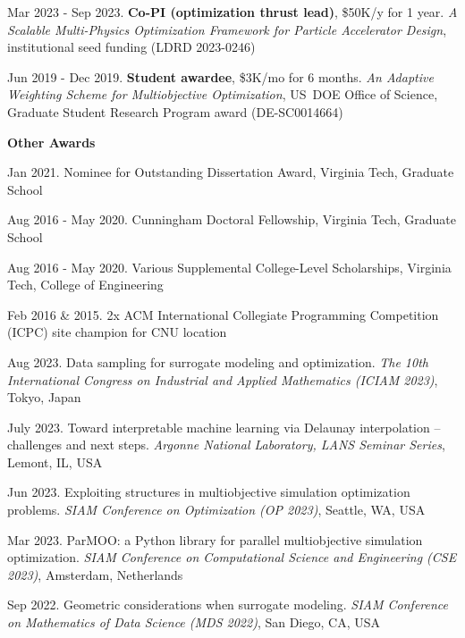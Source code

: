 \documentclass[alternative,compact,blue]{/Users/tyler/Git/thchang-style/styles/lualatex/yaac-another-awesome-cv}
\begin{document}
\begin{etaremune}
\item Mar 2023 - Sep 2023. {\bf Co-PI (optimization thrust lead)}, \$50K/y for 1 year. {\sl A Scalable Multi-Physics Optimization Framework for Particle Accelerator Design}, institutional seed funding (LDRD 2023-0246)
\item Jun 2019 - Dec 2019. {\bf Student awardee}, \$3K/mo for 6 months. {\sl An Adaptive Weighting Scheme for Multiobjective Optimization}, US~DOE Office of Science, Graduate Student Research Program award (DE-SC0014664)
\end{etaremune}

\nopagebreak

\medskip

\nopagebreak

\textbf{\large Other Awards}

\nopagebreak

\medskip

\nopagebreak

\begin{etaremune}
\item Jan 2021. Nominee for Outstanding Dissertation Award, Virginia Tech, Graduate School
\item Aug 2016 - May 2020. Cunningham Doctoral Fellowship, Virginia Tech, Graduate School
\item Aug 2016 - May 2020. Various Supplemental College-Level Scholarships, Virginia Tech, College of Engineering
\item Feb 2016 \& 2015. 2x ACM International Collegiate Programming Competition (ICPC) site champion for CNU location
\end{etaremune}

\goodbreak

\bigskip


\nopagebreak

\bigskip

\nopagebreak

\begin{etaremune}
\item Aug 2023. Data sampling for surrogate modeling and optimization. {\sl The 10th International Congress on Industrial and Applied Mathematics (ICIAM 2023)}, Tokyo, Japan
\item July 2023. Toward interpretable machine learning via Delaunay interpolation -- challenges and next steps. {\sl Argonne National Laboratory, LANS Seminar Series}, Lemont, IL, USA
\item Jun 2023. Exploiting structures in multiobjective simulation optimization problems. {\sl SIAM Conference on Optimization (OP 2023)}, Seattle, WA, USA
\item Mar 2023. ParMOO: a Python library for parallel multiobjective simulation optimization. {\sl SIAM Conference on Computational Science and Engineering (CSE 2023)}, Amsterdam, Netherlands
\item Sep 2022. Geometric considerations when surrogate modeling. {\sl SIAM Conference on Mathematics of Data Science (MDS 2022)}, San Diego, CA, USA
\end{etaremune}

\goodbreak
\end{document}
